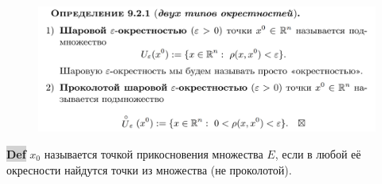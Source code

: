 \documentclass{article}
\begin{document}
\begin{figure}[h!]
    \centering
    \vspace{-1cm}
\end{figure}
\begin{figure}[h!]
    \centering
    \vspace{-1cm}
\end{figure}
\begin{figure}[h!]
    \centering
    \includegraphics[width=\textwidth]{7.png}
    \vspace{-1cm}
\end{figure}
\newpage
\begin{figure}[h!]
    \centering
\end{figure}
{\bfseries\colorbox{lightgray}{Def}} $x_0$ называется точкой прикосновения множества $E$, если в любой её окресности найдутся точки из множества (не проколотой).
\end{document}
